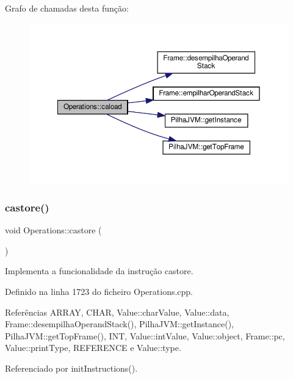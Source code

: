 Grafo de chamadas desta função\+:
\nopagebreak
\begin{figure}[H]
\begin{center}
\leavevmode
\includegraphics[width=350pt]{classOperations_a4bb55ffc2ba79a76a019a0c02d29d7f9_cgraph}
\end{center}
\end{figure}
\mbox{\label{classOperations_a417c4833f2f048350920358961cfab03}} 
\subsubsection{\texorpdfstring{castore()}{castore()}}
{\footnotesize\ttfamily void Operations\+::castore (\begin{DoxyParamCaption}{ }\end{DoxyParamCaption})\hspace{0.3cm}{\ttfamily [private]}}



Implementa a funcionalidade da instrução castore. 



Definido na linha 1723 do ficheiro Operations.\+cpp.



Referências A\+R\+R\+AY, C\+H\+AR, Value\+::char\+Value, Value\+::data, Frame\+::desempilha\+Operand\+Stack(), Pilha\+J\+V\+M\+::get\+Instance(), Pilha\+J\+V\+M\+::get\+Top\+Frame(), I\+NT, Value\+::int\+Value, Value\+::object, Frame\+::pc, Value\+::print\+Type, R\+E\+F\+E\+R\+E\+N\+CE e Value\+::type.



Referenciado por init\+Instructions().

